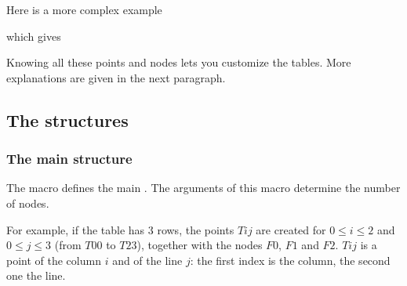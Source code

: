 Here is a more complex example

\begin{tkzexample}[small]
\end{tkzexample}

which gives
\begin{tkzexample}[small]
\end{tkzexample}

Knowing all these points and nodes lets you customize the tables. More explanations are given in the next paragraph.

\subsection{The structures}
\subsubsection{The main structure}

The macro  defines the main . The arguments of this macro determine the number of nodes.

For example, if the table has 3 rows, the points $Tij$ are created for $0\leq i\leq 2$ and $0\leq j\leq 3$ (from $T00$ to $T23$), together with the nodes $F0$, $F1$ and $F2$. $Tij$ is a point of the column $i$ and of the line $j$: the first index is the column, the second one the line.

